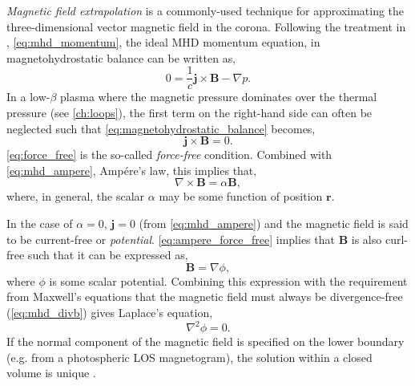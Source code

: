 \textit{Magnetic field extrapolation} is a commonly-used technique for approximating the three-dimensional vector magnetic field in the corona. Following the treatment in \citet[Chapter 3]{priest_magnetohydrodynamics_2014}, \autoref{eq:mhd_momentum}, the ideal MHD momentum equation, in magnetohydrostatic balance can be written as,
\begin{equation}\label{eq:magnetohydrostatic_balance}
    0 = \frac{1}{c}\mathbf{j}\times\mathbf{B} - \nabla p.
\end{equation}
In a low-$\beta$ plasma where the magnetic pressure dominates over the thermal pressure (see \autoref{ch:loops}), the first term on the right-hand side can often be neglected such that \autoref{eq:magnetohydrostatic_balance} becomes,
\begin{equation}\label{eq:force_free}
    \mathbf{j}\times\mathbf{B} = 0.
\end{equation}
\autoref{eq:force_free} is the so-called \textit{force-free} condition. Combined with \autoref{eq:mhd_ampere}, Amp\'{e}re's law, this implies that,
\begin{equation}\label{eq:ampere_force_free}
    \nabla\times\mathbf{B} = \alpha\mathbf{B},
\end{equation}
where, in general, the scalar $\alpha$ may be some function of position $\mathbf{r}$.

In the case of $\alpha=0$, $\mathbf{j}=0$ (from \autoref{eq:mhd_ampere}) and the magnetic field is said to be current-free or \textit{potential}. \autoref{eq:ampere_force_free} implies that $\mathbf{B}$ is also curl-free such that it can be expressed as,
\begin{equation}\label{eq:b_potential}
    \mathbf{B}=\nabla\phi,
\end{equation}
 where $\phi$ is some scalar potential. Combining this expression with the requirement from Maxwell's equations that the magnetic field must always be divergence-free (\autoref{eq:mhd_divb}) gives Laplace's equation,
\begin{equation}\label{eq:laplace}
    \nabla^2\phi = 0.
\end{equation}
If the normal component of the magnetic field is specified on the lower boundary (e.g. from a photospheric LOS magnetogram), the solution within a closed volume is unique \citep{priest_magnetohydrodynamics_2014}.

